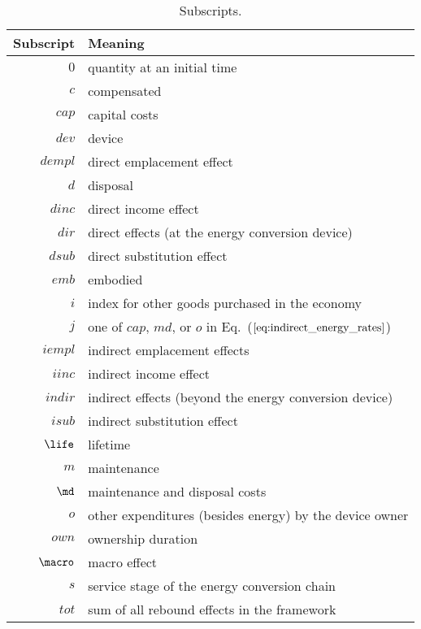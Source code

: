 \begin{table}
\centering
\caption{Subscripts.}
\begin{tabular}{r l}
  \toprule
  Subscript & Meaning \\
  \midrule
  $0$ & quantity at an initial time \\
  $c$ & compensated \\
  $cap$ & capital costs \\
  $dev$ & device \\
  $dempl$ & direct emplacement effect \\
  $d$ & disposal \\
  $dinc$ & direct income effect \\
  $dir$ & direct effects (at the energy conversion device) \\
  $dsub$ & direct substitution effect \\
  $emb$ & embodied \\
  $i$ & index for other goods purchased in the economy \\
  $j$ & one of $cap$, $md$, or $o$ in Eq.~($\ref{eq:indirect_energy_rates}$) \\
  $iempl$ & indirect emplacement effects \\
  $iinc$ & indirect income effect \\
  $indir$ & indirect effects (beyond the energy conversion device) \\
  $isub$ & indirect substitution effect \\
  $\life$ & lifetime \\
  $m$ & maintenance \\
  $\md$ & maintenance and disposal costs \\
  $o$ & other expenditures (besides energy) by the device owner \\
  $own$ & ownership duration \\
  $\macro$ & macro effect \\
  $s$ & service stage of the energy conversion chain \\
  $tot$ & sum of all rebound effects in the framework \\
  \bottomrule
\end{tabular}
\label{tab:subscripts}
\end{table}


